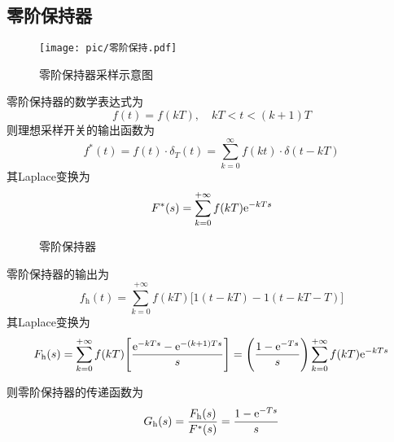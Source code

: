 \subsection{零阶保持器}
\begin{figure}[!htb]
	\centering
	\texttt{[image: pic/零阶保持.pdf]}
	\caption{零阶保持器采样示意图}
	\label{零阶保持器采样}
\end{figure}
零阶保持器的数学表达式为
\begin{equation}
	f(t) = f(kT), \quad kT < t<(k+1)T
\end{equation}
则理想采样开关的输出函数为
\begin{equation}
	f^*(t) = f(t)\cdot \delta_T(t) = \sum_{k = 0}^{\infty} f(kt) \cdot \delta(t - kT)
\end{equation}
其Laplace变换为
\begin{equation}
	F^*(s) = \sum_{k = 0}^{+\infty} f(kT) {\rm{e}}^{- kTs}
\end{equation}

\begin{figure}[!htb]
	\centering
	\caption{零阶保持器}
	\label{零阶保持器}
\end{figure}
零阶保持器的输出为
\begin{equation}
	f_\text{h}(t) = \sum_{k = 0}^{+\infty} f(kT)\big[1(t- kT) - 1(t - kT - T)\big]
\end{equation}
其Laplace变换为
\begin{equation}
	F_\text{h}(s) = \sum_{k = 0}^{+ \infty}f(kT)\Bigg[\dfrac{{\rm{e}}^{-kTs} - {\rm{e}}^{-(k+1)Ts}}{s}\Bigg] = \Bigg(\dfrac{1 - {\rm{e}}^{- Ts}}{s}\Bigg) \sum_{k = 0}^{+\infty}f(kT){\rm{e}}^{-kTs}
\end{equation}

则零阶保持器的传递函数为
\begin{equation}
	G_\text{h}(s) = \dfrac{F_{\text{h}}(s)}{F^*(s)} = \dfrac{1 - {\rm{e}}^{-Ts}}{s}
\end{equation}

